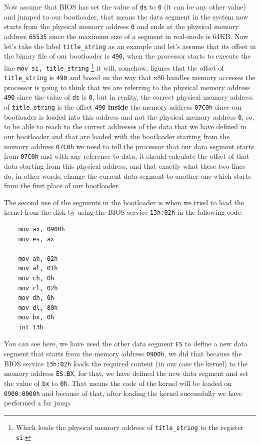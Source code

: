 Now assume that BIOS has set the value of \lstinline!ds! to
\lstinline!0! (it can be any other value) and jumped to our bootloader,
that means the data segment in the system now starts from the physical
memory address \lstinline!0! and ends at the physical memory address
\lstinline!65535! since the maximum size of a segment in real-mode is
64KB. Now let's take the label \lstinline!title_string! as an example
and let's assume that its offset in the binary file of our bootloader is
\lstinline!490!, when the processor starts to execute the line
\lstinline!mov si, title_string! \footnote{Which loads the physical
  memory address of \lstinline!title_string! to the register
  \lstinline!si!.} it will, somehow, figures that the offset of
\lstinline!title_string! is \lstinline!490! and based on the way that
x86 handles memory accesses the processor is going to think that we are
referring to the physical memory address \lstinline!490! since the value
of \lstinline!ds! is \lstinline!0!, but in reality, the correct physical
memory address of \lstinline!title_string! is the offset \lstinline!490!
\textbf{inside} the memory address \lstinline!07C0h! since our
bootloader is loaded into this address and not the physical memory
address \lstinline!0!, so, to be able to reach to the correct addresses
of the data that we have defined in our bootloader and that are loaded
with the bootloader starting from the memory address \lstinline!07C0h!
we need to tell the processor that our data segment starts from
\lstinline!07C0h! and with any reference to data, it should calculate
the offset of that data starting from this physical address, and that
exactly what these two lines do, in other words, change the current data
segment to another one which starts from the first place of our
bootloader.

The second use of the segments in the bootloader is when we tried to
load the kernel from the disk by using the BIOS service
\lstinline!13h:02h! in the following code.

\begin{lstlisting}
    mov ax, 0900h
    mov es, ax
    
    mov ah, 02h
    mov al, 01h
    mov ch, 0h
    mov cl, 02h
    mov dh, 0h
    mov dl, 80h
    mov bx, 0h
    int 13h
\end{lstlisting}

You can see here, we have used the other data segment \lstinline!ES! to
define a new data segment that starts from the memory address
\lstinline!0900h!, we did that because the BIOS service
\lstinline!13h:02h! loads the required content (in our case the kernel)
to the memory address \lstinline!ES:BX!, for that, we have defined the
new data segment and set the value of \lstinline!bx! to \lstinline!0h!.
That means the code of the kernel will be loaded on
\lstinline!0900:0000h! and because of that, after loading the kernel
successfully we have performed a far jump.

